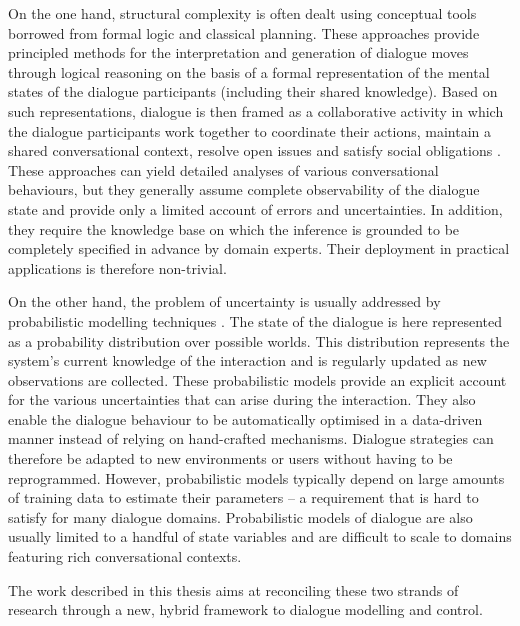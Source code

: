 On the one hand, structural complexity is often dealt using conceptual tools borrowed from formal logic and classical planning.  These approaches provide principled methods for the interpretation and generation of dialogue moves through logical reasoning on the basis of a formal representation of the mental states of the dialogue participants (including their shared knowledge). Based on such representations, dialogue is then framed as a collaborative activity in which the dialogue participants work together to coordinate their actions, maintain a shared conversational context, resolve open issues and satisfy social obligations \citep{larsson2002,Jokinen:2009,Ginzburg2012}. These approaches can yield detailed analyses of various conversational behaviours, but they generally assume complete observability of the dialogue state and provide only a limited account of errors and uncertainties. In addition, they require the knowledge base on which the inference is grounded to be completely specified in advance by domain experts.  Their deployment in practical applications is therefore non-trivial. 

On the other hand, the problem of uncertainty is usually addressed by probabilistic modelling techniques \citep{Roy:2000,FramptonL09,Young:2010}.  The state of the dialogue is here represented as a probability distribution over possible worlds.  This distribution represents the system's current knowledge of the interaction and is regularly updated as new observations are collected. These probabilistic models provide an explicit account for the various uncertainties that can arise during the interaction. They also enable the dialogue behaviour to be automatically optimised in a data-driven manner instead of relying on hand-crafted mechanisms.  Dialogue strategies can therefore be adapted to new environments or users without having to be reprogrammed. However, probabilistic models typically depend on large amounts of training data to estimate their parameters -- a requirement that is hard to satisfy for many dialogue domains.  Probabilistic models of dialogue are also usually limited to a handful of state variables and are difficult to scale to domains featuring rich conversational contexts. 

The work described in this thesis aims at reconciling these two strands of research through a new, hybrid framework to dialogue modelling and control. 

